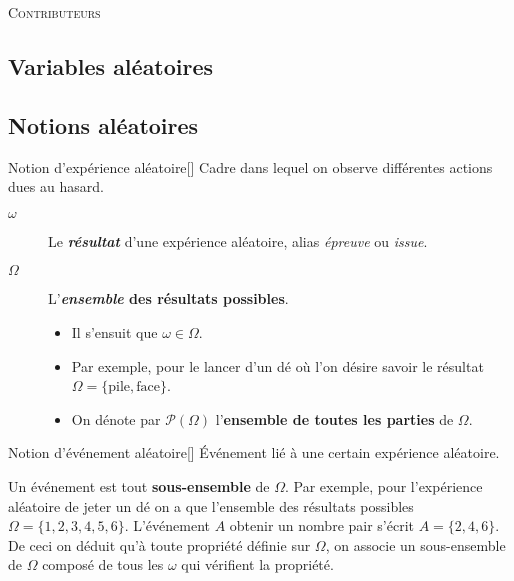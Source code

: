 \documentclass[10pt, french]{article}
\begin{document}
\begin{center}
	\textsc{\Large Contributeurs}\\[0.5cm] 
\end{center}
%

\newpage
\raggedcolumns
\begin{multicols*}{2}
\section{Variables aléatoires}
\subsection{Notions aléatoires}
\begin{definitionGENERAL}{Notion d'expérience aléatoire}[]
Cadre dans lequel on observe différentes actions dues au hasard.

\begin{distributions}[Notation]
\begin{description}
	\item[$\omega$]	Le \textbf{\textit{résultat}} d'une expérience aléatoire, alias \textit{épreuve} ou \textit{issue}.
	\item[$\Omega$]	L'\textbf{\textit{ensemble} des résultats possibles}.
		\begin{itemize}
		\item	Il s'ensuit que $\omega \in \Omega$.
		\item	Par exemple, pour le lancer d'un dé où l'on désire savoir le résultat $\Omega = \{\text{pile}, \text{face}\}$.
		\item	On dénote par $\mathcal{P}(\Omega)$ l'\textbf{ensemble de toutes les parties} de $\Omega$.
		\end{itemize}
\end{description}
\end{distributions}
\end{definitionGENERAL}

\begin{definitionGENERAL}{Notion d'événement aléatoire}[]
Événement lié à une certain expérience aléatoire. 

\bigskip	

Un événement est tout \textbf{sous-ensemble} de $\Omega$. Par exemple, pour l'expérience aléatoire de jeter un dé on a que l'ensemble des résultats possibles $\Omega = \{1, 2, 3, 4, 5, 6\}$. L'événement $A$ \og obtenir un nombre pair \fg{} s'écrit $A = \{2, 4, 6\}$. De ceci on déduit qu'à toute propriété définie sur $\Omega$, on associe un sous-ensemble de $\Omega$ composé de tous les $\omega$ qui vérifient la propriété. 
\end{definitionGENERAL}


\end{multicols*}
\end{document}
